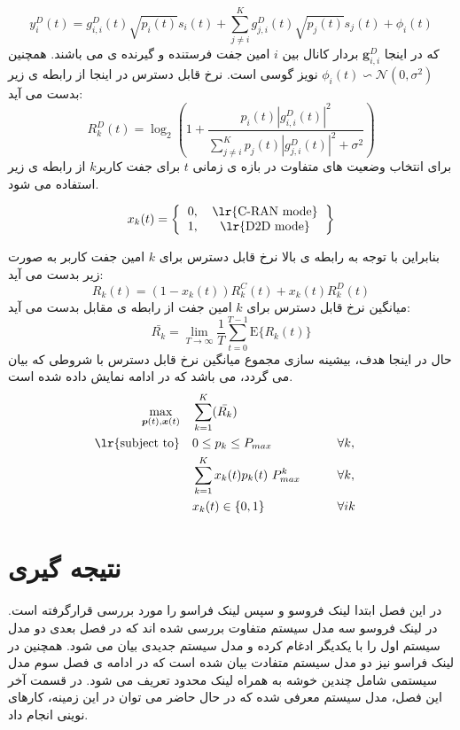 \begin{equation}
y^D_i(t) =  {g}_{i,i}^{D}(t) \sqrt{p_i(t)} s_i(t) 
+ \sum_{j\neq i}^{K} {g}_{j,i}^{D}(t) \sqrt{p_j(t)} s_j(t) + \phi_i(t) 
\end{equation}
که در اینجا  
$ \boldsymbol{g}_{i,i}^{D}$
بردار کانال بین $i$ امین جفت فرستنده و گیرنده ی  می باشند. همچنین 
 $\phi_i(t) \backsim \mathcal{N}(0,\sigma^2 )$
 نویز گوسی است.\newline
 نرخ قابل دسترس 
 در اینجا از رابطه ی زیر بدست می آید:
 \begin{equation}
R^{D}_k(t) = \log_{2} (1+ \frac{p_i(t) |g_{i,i}^{D}(t)|^2 }{ \sum_{j\neq i}^{K} p_j(t) |g_{j,i}^D (t)|^2 + \sigma^2 })
\end{equation}
برای انتخاب وضعیت های متفاوت در بازه ی زمانی $t$  برای جفت کاربر$k$ از رابطه ی زیر استفاده می شود.
\begin{latin}
\[ 
x_k(t) =
\left \{
 \begin{tabular}{cc}
  0,  & \text{\lr{C-RAN mode}} \\
  1,  & \text{\lr{D2D mode}} \\
  \end{tabular}
  \right \}
\]
\end{latin}
بنابراین با توجه به  رابطه ی بالا نرخ قابل دسترس  برای  $k$ امین جفت کاربر به صورت زیر بدست می آید:
\begin{equation}
R_k(t)  = (1-x_k(t)) R_k^C(t) + x_k(t) R_k^D(t)
\end{equation}
میانگین نرخ قابل دسترس برای $k$ امین جفت  از رابطه ی مقابل بدست می آید:
\begin{equation}
\bar{R_k} = \lim_{T\to\infty} \frac{1}{T} \sum_{t=0}^{T-1} \mathrm{E}\{R_k(t)\} 
\end{equation}
حال در اینجا هدف، بیشینه سازی مجموع میانگین نرخ قابل دسترس با شروطی که بیان می گردد، می باشد که در ادامه نمایش داده شده است.
   \begin{equation}
\begin{aligned}
\max\limits_{\boldsymbol{p}(t),  \boldsymbol{x}(t)}   \quad &   \sum_{k=1}^{K}(\bar{R_k})\\
\text{\lr{subject to}} \quad  &  0 \leq {p}_{k} \leq P_{max} && \qquad \forall k,   \\
& \sum_{k=1}^{K} x_k(t) p_k(t) \ P_{max}^{k} && \qquad \forall k, \\ 
&x_k(t) \in \{ 0, 1 \}  &&\qquad  \forall ik\\
\end{aligned}			
\end{equation}
\section{نتیجه گیری}
در این فصل ابتدا لینک فروسو و سپس لینک فراسو را مورد بررسی قرارگرفته است. در لینک فروسو سه مدل سیستم متفاوت بررسی شده اند که در فصل بعدی دو مدل سیستم اول را با یکدیگر ادغام کرده و مدل سیستم جدیدی بیان می شود. همچنین در لینک فراسو نیز دو مدل سیستم متفادت بیان شده است که در ادامه ی فصل سوم مدل سیستمی شامل چندین خوشه به همراه لینک محدود  تعریف می شود. در قسمت آخر این فصل، مدل سیستم  معرفی شده که در حال حاضر می توان در این زمینه، کارهای نوینی انجام داد. 
